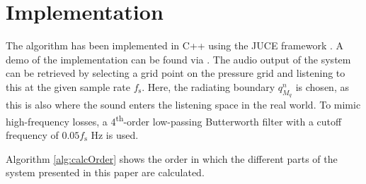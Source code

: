 \section{Implementation}\label{sec:implementation}
The algorithm has been implemented in C++ using the JUCE framework \cite{JUCE}. A demo of the implementation can be found via \cite{DEMO}. The audio output of the system can be retrieved by selecting a grid point on the pressure grid and listening to this at the given sample rate $f_\text{s}$. Here, the radiating boundary $q_{M_q}^n$ is chosen, as this is also where the sound enters the listening space in the real world. To mimic high-frequency losses, a 4\textsuperscript{th}-order low-passing Butterworth filter with a cutoff frequency of $0.05 f_\text{s}$ Hz is used.  

Algorithm \ref{alg:calcOrder} shows the order in which the different parts of the system presented in this paper are calculated. 

